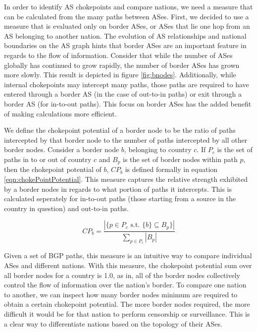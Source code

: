 \documentclass[10pt, conference, letterpaper]{IEEEtran}
\begin{document}
In order to identify AS chokepoints and compare nations, we need a measure that can be calculated from the many paths between
ASes. First, we decided to use a measure that is evaluated only on border ASes, or ASes that lie one hop from an AS belonging to another nation. 
The evolution of AS relationships and national boundaries on the AS graph hints that border ASes are an important feature in regards to the flow
of information. Consider that while the number of ASes globally has continued to grow rapidly, the number of border ASes has grown more slowly.
This result is depicted in figure \ref{fig:bnodes}. Additionally, while internal chokepoints may intercept many paths, those paths are required
to have entered through a border AS (in the case of out-to-in paths) or exit through a border AS (for in-to-out paths). This focus on border ASes has
the added benefit of making calculations more efficient.

\par
We define the chokepoint potential of a border node to be the ratio of paths intercepted by that border node
to the number of paths intercepted by all other border nodes. Consider a border node $b$, belonging to country $c$.
If $P_c$ is the set of paths in to or out of country $c$ and $B_p$ is the set of border nodes within path $p$, then the
chokepoint potential of $b$, $CP_b$ is defined formally in equation \ref{eqn:chokePointPotential}. This measure captures
the relative strength exhibited by a border nodes in regards to what portion of paths it intercepts. This is calculated
seperately for in-to-out paths (those starting from a source in the country in question) and out-to-in paths.

\begin{equation}\label{eqn:chokePointPotential}
CP_b = \frac{|\{p \in P_c \textrm{ s.t. } \{b\} \subseteq B_p\}|}{\sum_{p \in P_c}|B_p|}
\end{equation}

\par
Given a set of BGP paths, this measure is an intuitive way to compare individual ASes and different nations. With this measure,
the chokepoint potential sum over all border nodes for a country is 1.0, as in, all of the border nodes collectively control the
flow of information over the nation's border. To compare one nation to another, we can inspect how many border nodes minimum are required
to obtain a certain chokepoint potential. The more border nodes required, the more difficult it would be for that nation to perform
censorship or surveillance. This is a clear way to differentiate nations based on the topology of their ASes.
\end{document}
